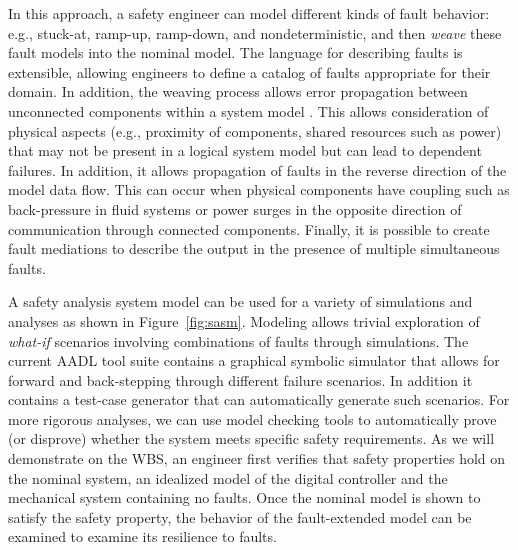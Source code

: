 In this approach, a safety engineer can model different kinds of fault behavior: e.g., stuck-at, ramp-up, ramp-down, and nondeterministic, and then {\em weave} these fault models into the nominal model. The language for describing faults is extensible, allowing engineers to define a catalog of faults appropriate for their domain. In addition, the weaving process allows error propagation between unconnected components within a system model \cite{Joshi07:Hase}. This allows consideration of physical aspects (e.g., proximity of components, shared resources such as power) that may not be present in a logical system model but can lead to dependent failures. In addition, it allows propagation of faults in the reverse direction of the model data flow. This can occur when physical components have coupling such as back-pressure in fluid systems or power surges in the opposite direction of communication through connected components. Finally, it is possible to create fault mediations to describe the output in the presence of multiple simultaneous faults.





A safety analysis system model can be used for a variety of simulations and analyses as shown in Figure~\ref{fig:sasm}.  Modeling allows trivial exploration of \textit{what-if} scenarios involving combinations of faults through simulations.  The current AADL tool suite contains a graphical symbolic simulator that allows for forward and back-stepping through different failure scenarios.  In addition it contains a test-case generator that can automatically generate such scenarios.
For more rigorous analyses, we can use model checking tools to automatically prove (or disprove) whether the system meets specific safety requirements.  As we will demonstrate on the WBS, an engineer first verifies that safety properties hold on the nominal system, an idealized model of the digital controller and the mechanical system containing no faults.  Once the nominal model is shown to satisfy the safety property, the behavior of the fault-extended model can be examined to examine its resilience to faults.

